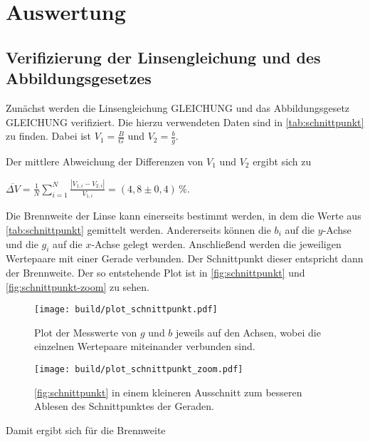 \section{Auswertung}
\label{sec:Auswertung}

\subsection{Verifizierung der Linsengleichung und des Abbildungsgesetzes}

Zunächst werden die Linsengleichung GLEICHUNG und das Abbildungsgesetz GLEICHUNG verifiziert.
Die hierzu verwendeten Daten sind in \autoref{tab:schnittpunkt} zu finden.
Dabei ist $V_1 = \frac{B}{G}$ und $V_2 = \frac{b}{g}$.



Der mittlere Abweichung der Differenzen von $V_1$ und $V_2$ ergibt sich zu

\begin{center}
    $\overline{\Delta V} = \frac{1}{N} \sum^N_{i=1} \frac{| V_{1,i} - V_{2,i} |}{V_{1,i}} = (4,8 \pm 0,4) \, \%$.
\end{center}

Die Brennweite der Linse kann einerseits bestimmt werden, in dem die Werte aus \autoref{tab:schnittpunkt} gemittelt werden.
Andererseits können die $b_i$ auf die $y$-Achse und die $g_i$ auf die $x$-Achse gelegt werden. Anschließend werden die jeweiligen Wertepaare mit einer Gerade verbunden.
Der Schnittpunkt dieser entspricht dann der Brennweite.
Der so entstehende Plot ist in \autoref{fig:schnittpunkt} und \autoref{fig:schnittpunkt-zoom} zu sehen.

\begin{figure}
  \centering
  \texttt{[image: build/plot\_schnittpunkt.pdf]}
  \caption{Plot der Messwerte von $g$ und $b$ jeweils auf den Achsen, wobei die einzelnen Wertepaare miteinander verbunden sind.}
  \label{fig:schnittpunkt}
\end{figure}

\begin{figure}
  \centering
  \texttt{[image: build/plot\_schnittpunkt\_zoom.pdf]}
  \caption{\autoref{fig:schnittpunkt} in einem kleineren Ausschnitt zum besseren Ablesen des Schnittpunktes der Geraden.}
  \label{fig:schnittpunkt-zoom}
\end{figure}

Damit ergibt sich für die Brennweite

